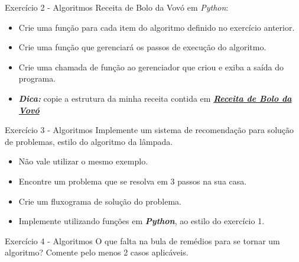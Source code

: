 \documentclass{beamer}
\begin{document}
\begin{frame}{Exercício 2 - Algoritmos}
	Receita de Bolo da Vovó em \textit{Python}:
	\begin{itemize}
		\item Crie uma função para cada item do algoritmo definido no exercício anterior.
		\item Crie uma função que gerenciará os passos de execução do algoritmo.
		\item Crie uma chamada de função ao gerenciador que criou e exiba a saída do programa.
		\item \textbf{\textit{Dica:}} copie a estrutura da minha receita contida em \href{Exercicios/Modulo_01/exercicio_01/receita_de_bolo.py}{\textbf{\textit{Receita de Bolo da Vovó}}}
	\end{itemize}
\end{frame}


\begin{frame}{Exercício 3 - Algoritmos}
	Implemente um sistema de recomendação para solução de problemas, estilo do algoritmo da lâmpada.
	\begin{itemize}
		\item Não vale utilizar o mesmo exemplo.
		\item Encontre um problema que se resolva em 3 passos na sua casa.
		\item Crie um fluxograma de solução do problema.
		\item Implemente utilizando funções em \textbf{\textit{Python}}, ao estilo do exercício 1.
	\end{itemize}
\end{frame}


\begin{frame}{Exercício 4 - Algoritmos}
	 O que falta na bula de remédios para se tornar um algoritmo? Comente pelo menos 2 casos aplicáveis.
\end{frame}

\backmatter
\end{document}
